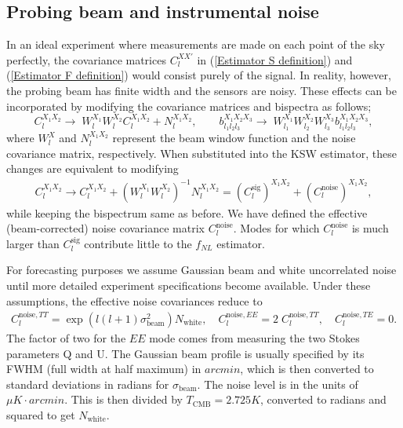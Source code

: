 \subsection{Probing beam and instrumental noise}

In an ideal experiment where measurements are made on each point of the sky perfectly, the covariance matrices $C_l^{XX'}$ in (\ref{Estimator S definition}) and (\ref{Estimator F definition}) would consist purely of the signal. In reality, however, the probing beam has finite width and the sensors are noisy. These effects can be incorporated by modifying the covariance matrices and bispectra as follows;
\begin{equation}
	C_l^{X_1 X_2} \rightarrow\; W_l^{X_1} W_l^{X_2} C_l^{X_1 X_2} + N_l^{X_1 X_2} ,\qquad b_{l_1 l_2 l_3}^{X_1 X_2 X_3} \rightarrow\; W_{l_1}^{X_1} W_{l_2}^{X_2} W_{l_3}^{X_3} b_{l_1 l_2 l_3}^{X_1 X_2 X_3},
\end{equation}
where $W_l^X$ and $N_l^{X_1 X_2}$ represent the beam window function and the noise covariance matrix, respectively. When substituted into the KSW estimator, these changes are equivalent to modifying
\begin{align}
	C_l^{X_1 X_2} \rightarrow C_l^{X_1 X_2} + \left( W_l^{X_1} W_l^{X_2} \right)^{-1} N_l^{X_1 X_2} = ( C_l^\text{sig} )^{X_1 X_2} + ( C_l^\text{noise} )^{X_1 X_2},
\end{align}
while keeping the bispectrum same as before. We have defined the effective (beam-corrected) noise covariance matrix $C_l^\text{noise}$. Modes for which $C_l^\text{noise}$ is much larger than $C_l^\text{sig}$ contribute little to the $f_{NL}$ estimator.

For forecasting purposes we assume Gaussian beam and white uncorrelated noise until more detailed experiment specifications become available. Under these assumptions, the effective noise covariances reduce to \cite{Ng1999}
\begin{eqnarray}
	C_l^{\text{noise}, TT} = \exp\left({l(l+1)\sigma_\text{beam}^2} \right)N_\text{white}, \quad C_l^{\text{noise}, EE} =2\; C_l^{\text{noise}, TT}, \quad C_l^{\text{noise}, TE} = 0.
\end{eqnarray}
The factor of two for the $EE$ mode comes from measuring the two Stokes parameters Q and U. The Gaussian beam profile is usually specified by its FWHM (full width at half maximum) in $arcmin$, which is then converted to standard deviations in radians for $\sigma_\text{beam}$. The noise level is in the units of $\mu K\cdot arcmin$. This is then divided by $T_\text{CMB} = 2.725K$, converted to radians and squared to get $N_\text{white}$.

